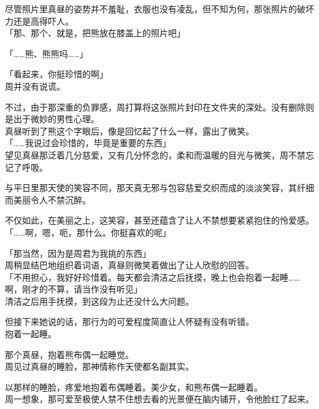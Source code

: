 尽管照片里真昼的姿势并不羞耻，衣服也没有凌乱，但不知为何，那张照片的破坏力还是高得吓人。\\

「那、那个、就是，把熊放在膝盖上的照片吧」

「……熊、熊熊吗……」

「看起来，你挺珍惜的啊」\\

周并没有说谎。

不过，由于那深重的负罪感，周打算将这张照片封印在文件夹的深处。没有删除则是出于微妙的男性心理。\\

真昼听到了熊这个字眼后，像是回忆起了什么一样，露出了微笑。\\

「……我说过会珍惜的，毕竟是重要的东西」\\

望见真昼那泛着几分慈爱，又有几分怀念的，柔和而温暖的目光与微笑，周不禁忘记了呼吸。

与平日里那天使的笑容不同，那天真无邪与包容慈爱交织而成的淡淡笑容，其纤细而美丽令人不禁沉醉。

不仅如此，在美丽之上，这笑容，甚至还蕴含了让人不禁想要紧紧抱住的怜爱感。\\

「……啊，嗯，呃，那什么。你挺喜欢的呢」

「那当然，因为是周君为我挑的东西」\\

周稍显结巴地组织着词语，真昼则微笑着做出了让人欣慰的回答。\\

「不用担心，我好好珍惜着。每天都会清洁之后抚摸，晚上也会抱着一起睡……啊，刚才的不算，请当作没有听见」\\

清洁之后用手抚摸，到这段为止还没什么大问题。

但接下来她说的话，那行为的可爱程度简直让人怀疑有没有听错。\\

抱着一起睡。

那个真昼，抱着熊布偶一起睡觉。\\

周见过真昼的睡脸，那神情称作天使都名副其实。

以那样的睡脸，疼爱地抱着布偶睡着。美少女，和熊布偶一起睡着。\\

周一想象，那可爱至极使人禁不住想去看的光景便在脑内铺开，令他脸红了起来。\\

